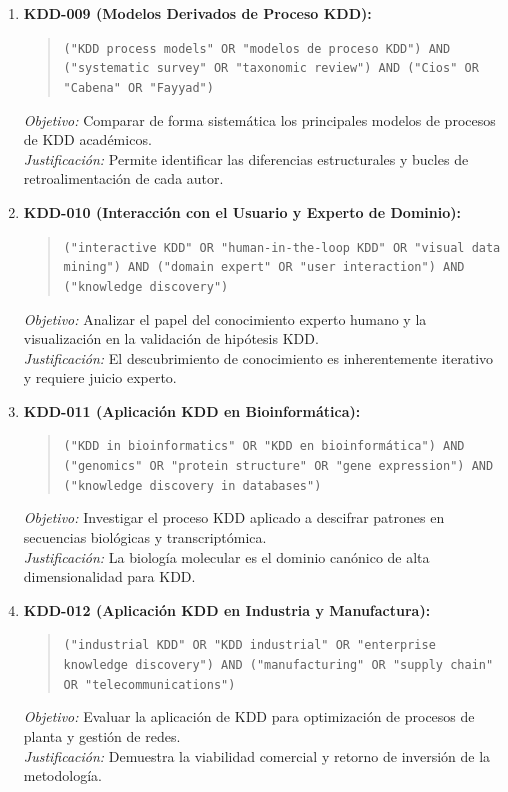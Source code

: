 \begin{enumerate}
  \textit{Justificación:} El valor del conocimiento depende de su novedad y aplicabilidad operativa.
  \item \textbf{KDD-009 (Modelos Derivados de Proceso KDD):}
  \begin{quote}
  \texttt{("KDD process models" OR "modelos de proceso KDD") AND ("systematic survey" OR "taxonomic review") AND ("Cios" OR "Cabena" OR "Fayyad")}
  \end{quote}
  \textit{Objetivo:} Comparar de forma sistemática los principales modelos de procesos de KDD académicos.\\
  \textit{Justificación:} Permite identificar las diferencias estructurales y bucles de retroalimentación de cada autor.
  \item \textbf{KDD-010 (Interacción con el Usuario y Experto de Dominio):}
  \begin{quote}
  \texttt{("interactive KDD" OR "human-in-the-loop KDD" OR "visual data mining") AND ("domain expert" OR "user interaction") AND ("knowledge discovery")}
  \end{quote}
  \textit{Objetivo:} Analizar el papel del conocimiento experto humano y la visualización en la validación de hipótesis KDD.\\
  \textit{Justificación:} El descubrimiento de conocimiento es inherentemente iterativo y requiere juicio experto.
  \item \textbf{KDD-011 (Aplicación KDD en Bioinformática):}
  \begin{quote}
  \texttt{("KDD in bioinformatics" OR "KDD en bioinformática") AND ("genomics" OR "protein structure" OR "gene expression") AND ("knowledge discovery in databases")}
  \end{quote}
  \textit{Objetivo:} Investigar el proceso KDD aplicado a descifrar patrones en secuencias biológicas y transcriptómica.\\
  \textit{Justificación:} La biología molecular es el dominio canónico de alta dimensionalidad para KDD.
  \item \textbf{KDD-012 (Aplicación KDD en Industria y Manufactura):}
  \begin{quote}
  \texttt{("industrial KDD" OR "KDD industrial" OR "enterprise knowledge discovery") AND ("manufacturing" OR "supply chain" OR "telecommunications")}
  \end{quote}
  \textit{Objetivo:} Evaluar la aplicación de KDD para optimización de procesos de planta y gestión de redes.\\
  \textit{Justificación:} Demuestra la viabilidad comercial y retorno de inversión de la metodología.

\end{enumerate}
